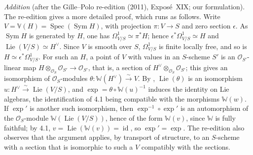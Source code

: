 \par\medskip\noindent
\emph{Addition} (after the Gille--Polo re-edition (2011), Exposé~XIX; our
formulation).  The re-edition gives a more detailed proof, which runs as
follows.  Write \(V=\mathbb V(H)=\operatorname{Spec}(\operatorname{Sym}H)\),
with projection \(\pi\colon V\to S\) and zero section \(\epsilon\).  As
\(\operatorname{Sym}H\) is generated by \(H\), one has
\(\Omega^1_{V/S}\simeq\pi^*H\); hence \(\epsilon^*\Omega^1_{V/S}\simeq H\)
and \(\operatorname{Lie}(V/S)\simeq H^\vee\).  Since \(V\) is smooth over
\(S\), \(\Omega^1_{V/S}\) is finite locally free, and so is
\(H\simeq\epsilon^*\Omega^1_{V/S}\).  For such an \(H\), a point of \(V\)
with values in an \(S\)-scheme \(S'\) is an \(\mathcal O_{S'}\)-linear map
\(H\otimes_{\mathcal O_S}\mathcal O_{S'}\to\mathcal O_{S'}\), that is, a
section of \(H^\vee\otimes_{\mathcal O_S}\mathcal O_{S'}\); this gives an
isomorphism of \(\mathcal O_S\)-modules
\(\theta\colon\mathbb W(H^\vee)\xrightarrow{\sim}V\).  By
, \(\operatorname{Lie}(\theta)\) is an isomorphism
\(u\colon H^\vee\xrightarrow{\sim}\operatorname{Lie}(V/S)\), and
\(\exp=\theta\circ\mathbb W(u)^{-1}\) induces the identity on Lie algebras,
the identification of 4.1 being compatible with the morphisms
\(\mathbb W(w)\).  If \(\exp'\) is another such isomorphism, then
\(\exp^{-1}\circ\exp'\) is an automorphism of the \(\mathcal O_S\)-module
\(\mathbb W(\operatorname{Lie}(V/S))\), hence of the form \(\mathbb W(v)\),
since \(\mathbb W\) is fully faithful; by 4.1,
\(v=\operatorname{Lie}(\mathbb W(v))=\operatorname{id}\), so
\(\exp'=\exp\).  The re-edition also observes that the argument applies, by
transport of structure, to an \(S\)-scheme with a section that is isomorphic
to such a \(V\) compatibly with the sections.
\par\medskip
